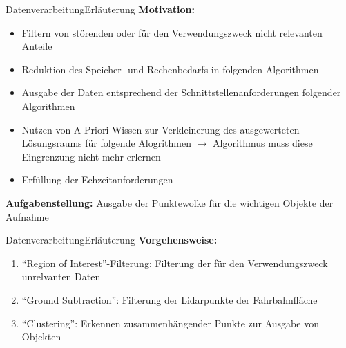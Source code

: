 \documentclass[169, handout	]{THIbeamer} %
\begin{document}
	\begin{frame}{Datenverarbeitung}{Erläuterung}
		\textbf{Motivation:} 
		\begin{itemize}
			\item Filtern von störenden oder für den Verwendungszweck nicht relevanten Anteile
			\item Reduktion des Speicher- und Rechenbedarfs in folgenden Algorithmen
			\item Ausgabe der Daten entsprechend der Schnittstellenanforderungen folgender Algorithmen
			\item Nutzen von A-Priori Wissen zur Verkleinerung des ausgewerteten Lösungsraums für folgende Alogrithmen $\rightarrow$ Algorithmus muss diese Eingrenzung nicht mehr erlernen
			\item Erfüllung der Echzeitanforderungen
		\end{itemize}
		\textbf{Aufgabenstellung:} Ausgabe der Punktewolke für die wichtigen Objekte der Aufnahme
	\end{frame}
	\begin{frame}{Datenverarbeitung}{Erläuterung}
		\textbf{Vorgehensweise:} 
		\begin{enumerate}
			\item \enquote{Region of Interest}-Filterung: Filterung der für den Verwendungszweck unrelvanten Daten
			\item \enquote{Ground Subtraction}: Filterung der Lidarpunkte der Fahrbahnfläche
			\item \enquote{Clustering}: Erkennen zusammenhängender Punkte zur Ausgabe von Objekten
		\end{enumerate}
	\end{frame}	
\end{document}

